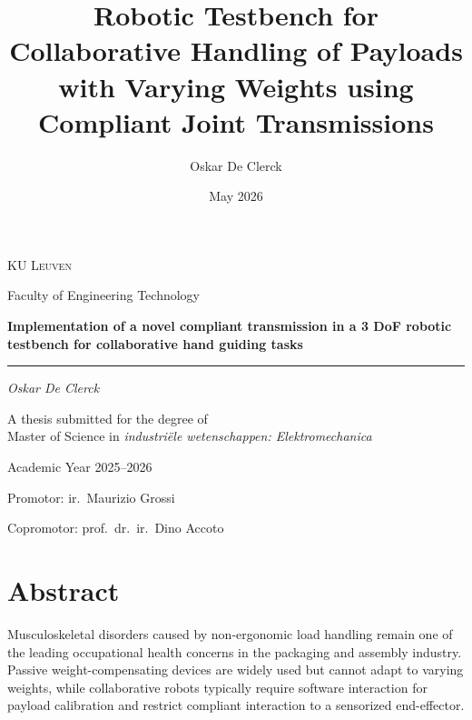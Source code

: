 \documentclass[11pt,a4paper,twoside,openright]{book}
\title{Robotic Testbench for Collaborative Handling of Payloads with Varying Weights using Compliant Joint Transmissions}
\author{Oskar De Clerck}
\date{May 2026}
\begin{document}

\begin{titlepage}
    \centering
    \vspace*{2cm}

    {\Large\scshape KU Leuven\par}
    \vspace{0.5cm}
    {\large Faculty of Engineering Technology\par}
    \vspace{2.5cm}

    {\Huge\bfseries Implementation of a novel compliant transmission in a 3 DoF robotic testbench for collaborative hand guiding tasks\par}   %
    \vspace{0.5cm}
    \rule{10cm}{0.4pt}\par
    \vspace{3cm}

    {\Large\itshape Oskar De Clerck\par}
    \vfill

    {\large A thesis submitted for the degree of\\
    Master of Science in \textit{industriële wetenschappen: Elektromechanica}\par}
    \vfill

    {\large Academic Year 2025--2026\par}
    \vspace{0.5cm}
    {\large Promotor: ir.\ Maurizio Grossi\par}
    {\large Copromotor: prof.\ dr.\ ir.\ Dino Accoto\par}
\end{titlepage}


\frontmatter

\chapter*{Abstract}

Musculoskeletal disorders caused by non-ergonomic load handling remain one of the leading occupational health concerns in the packaging and assembly industry. Passive weight-compensating devices are widely used but cannot adapt to varying weights, while collaborative robots typically require software interaction for payload calibration and restrict compliant interaction to a sensorized end-effector.
\end{document}
